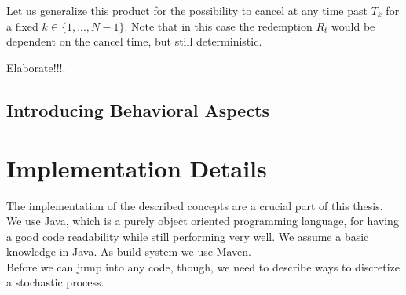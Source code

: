 \documentclass[12pt]{article}
\begin{document}
	
	Let us generalize this product for the possibility to cancel at any time past $T_k$ for a fixed $k \in \{1,...,N-1\}$.
	Note that in this case the redemption $\tilde{R}_t$ would be dependent on the cancel time, but still deterministic.
	
	\color{red}Elaborate!!!\color{black}. 
	
	
	
	\subsection{Introducing Behavioral Aspects}
	
	
	
	
	
	\pagebreak
	\section{Implementation Details}
	The implementation of the described concepts are a crucial part of this thesis.\\
	We use Java, which is a purely object oriented programming language, for having a good  code readability while still performing very well. We assume a basic knowledge in Java.
	As build system we use Maven.\\
	Before we can jump into any code, though, we need to describe ways to discretize a stochastic process.
	
\end{document}
